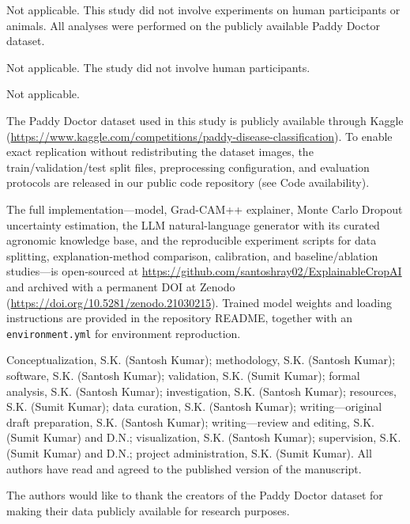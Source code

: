 \documentclass[pdflatex,sn-mathphys-num]{sn-jnl}%
\begin{document}
Not applicable. This study did not involve experiments on human participants or animals. All analyses were performed on the publicly available Paddy Doctor dataset.

Not applicable. The study did not involve human participants.

Not applicable.

The Paddy Doctor dataset used in this study is publicly available through Kaggle (\url{https://www.kaggle.com/competitions/paddy-disease-classification}). To enable exact replication without redistributing the dataset images, the train/validation/test split files, preprocessing configuration, and evaluation protocols are released in our public code repository (see Code availability).

The full implementation---model, Grad-CAM++ explainer, Monte Carlo Dropout uncertainty estimation, the LLM natural-language generator with its curated agronomic knowledge base, and the reproducible experiment scripts for data splitting, explanation-method comparison, calibration, and baseline/ablation studies---is open-sourced at \url{https://github.com/santoshray02/ExplainableCropAI} and archived with a permanent DOI at Zenodo (\url{https://doi.org/10.5281/zenodo.21030215}). Trained model weights and loading instructions are provided in the repository README, together with an \texttt{environment.yml} for environment reproduction.

Conceptualization, S.K. (Santosh Kumar); methodology, S.K. (Santosh Kumar); software, S.K. (Santosh Kumar); validation, S.K. (Sumit Kumar); formal analysis, S.K. (Santosh Kumar); investigation, S.K. (Santosh Kumar); resources, S.K. (Sumit Kumar); data curation, S.K. (Santosh Kumar); writing---original draft preparation, S.K. (Santosh Kumar); writing---review and editing, S.K. (Sumit Kumar) and D.N.; visualization, S.K. (Santosh Kumar); supervision, S.K. (Sumit Kumar) and D.N.; project administration, S.K. (Sumit Kumar). All authors have read and agreed to the published version of the manuscript.

The authors would like to thank the creators of the Paddy Doctor dataset for making their data publicly available for research purposes.


\end{document}

